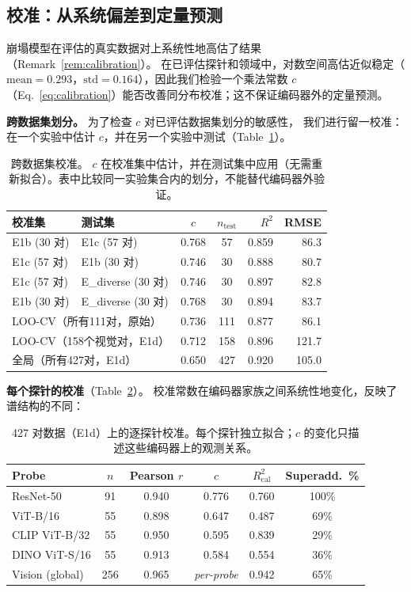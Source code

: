 \documentclass{article}
\begin{document}
\subsection{校准：从系统偏差到定量预测}
\label{sec:calibration}

崩塌模型在评估的真实数据对上系统性地高估了结果（Remark~\ref{rem:calibration}）。
在已评估探针和领域中，对数空间高估近似稳定（$\mathrm{mean}{=}0.293$，$\mathrm{std}{=}0.164$），因此我们检验一个乘法常数 $c$（Eq.~\ref{eq:calibration}）能否改善同分布校准；这不保证编码器外的定量预测。

\textbf{跨数据集划分。}
为了检查 $c$ 对已评估数据集划分的敏感性，
我们进行留一校准：在一个实验中估计 $c$，并在另一个实验中测试（Table~\ref{tab:calibration}）。

\begin{table}[h]
\centering
\caption{跨数据集校准。
$c$ 在校准集中估计，并在测试集中应用（无需重新拟合）。表中比较同一实验集合内的划分，不能替代编码器外验证。}
\label{tab:calibration}
\small
\setlength{\tabcolsep}{4pt}
\begin{tabular}{llccrr}
\toprule
校准集 & 测试集 & $c$ & $n_{\mathrm{test}}$ & $R^2$ & RMSE \\
\midrule
E1b (30 对) & E1c (57 对) & 0.768 & 57 & 0.859 & 86.3 \\
E1c (57 对) & E1b (30 对) & 0.746 & 30 & 0.888 & 80.7 \\
E1c (57 对) & E\_diverse (30 对) & 0.746 & 30 & 0.897 & 82.8 \\
E1b (30 对) & E\_diverse (30 对) & 0.768 & 30 & 0.894 & 83.7 \\
\midrule
\multicolumn{2}{l}{LOO-CV（所有111对，原始）} & 0.736 & 111 & 0.877 & 86.1 \\
\multicolumn{2}{l}{LOO-CV（158个视觉对，E1d）} & 0.712 & 158 & 0.896 & 121.7 \\
\multicolumn{2}{l}{全局（所有427对，E1d）} & 0.650 & 427 & 0.920 & 105.0 \\
\bottomrule
\end{tabular}\normalsize
\end{table}

\textbf{每个探针的校准}（Table~\ref{tab:perprobe_cal}）。
校准常数在编码器家族之间系统性地变化，反映了谱结构的不同：
\begin{table}[h]
\centering
\caption{427 对数据（E1d）上的逐探针校准。每个探针独立拟合；$c$ 的变化只描述这些编码器上的观测关系。}
\label{tab:perprobe_cal}
\small
\setlength{\tabcolsep}{4pt}
\begin{tabular}{lccccc}
\toprule
Probe & $n$ & Pearson $r$ & $c$ & $R^2_{\mathrm{cal}}$ & Superadd.\ \% \\
\midrule
ResNet-50        & 91  & 0.940 & 0.776 & 0.760 & 100\% \\
ViT-B/16         & 55  & 0.898 & 0.647 & 0.487 &  69\% \\
CLIP ViT-B/32    & 55  & 0.950 & 0.595 & 0.839 &  29\% \\
DINO ViT-S/16    & 55  & 0.913 & 0.584 & 0.554 &  36\% \\
\midrule
Vision (global)  & 256 & 0.965 & \emph{per-probe} & 0.942 &  65\% \\
\bottomrule
\end{tabular}\normalsize
\end{table}
\end{document}
